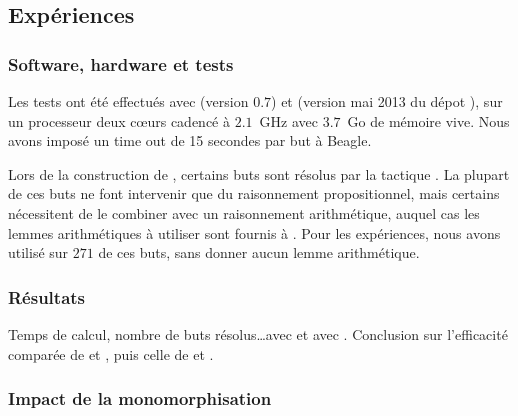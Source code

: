 \subsection{Expériences}
\label{sec:experiences:experiences}

\subsubsection{Software, hardware et tests}
Les tests ont été effectués avec \beagle (version $0.7$) et \holfour (version mai 2013 du dépot ), sur un processeur deux cœurs cadencé à $2.1$~GHz avec $3.7$~Go de mémoire vive. 
Nous avons imposé un time out de 15 secondes par but à Beagle.
 
Lors de la construction de \holfour, certains buts sont résolus par la
tactique \metistac. La plupart de ces buts ne font intervenir que du
raisonnement propositionnel, mais certains nécessitent de le combiner
avec un raisonnement arithmétique, auquel cas les lemmes arithmétiques à
utiliser sont fournis à \metistac. Pour les expériences, nous avons
utilisé \beagletac sur $271$ de ces buts, sans donner aucun lemme
arithmétique.


\subsubsection{Résultats}

\todo Temps de calcul, nombre de buts résolus\dots avec \metistac et
avec \beagletac. Conclusion sur l'efficacité comparée de \beagletac et
\metistac, puis celle de \beagle et \metis.



\subsubsection{Impact de la monomorphisation}

